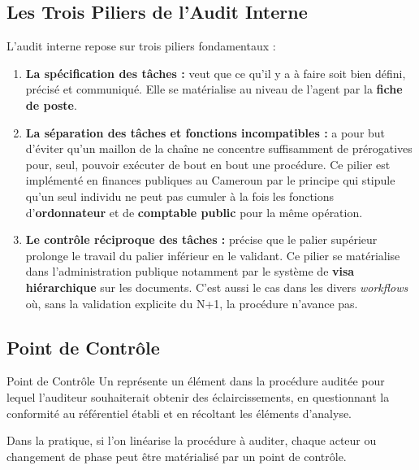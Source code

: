 \subsection{Les Trois Piliers de l'Audit Interne}

L'audit interne repose sur trois piliers fondamentaux :

\begin{enumerate}
  \item \textbf{La spécification des tâches :} veut que ce qu'il y a à faire soit
    bien défini, précisé et communiqué. Elle se matérialise au niveau de l'agent par
    la \textbf{fiche de poste}.

  \item \textbf{La séparation des tâches et fonctions incompatibles :} a pour but
    d'éviter qu'un maillon de la chaîne ne concentre suffisamment de prérogatives
    pour, seul, pouvoir exécuter de bout en bout une procédure. Ce pilier est
    implémenté en finances publiques au Cameroun par le principe qui stipule qu'un
    seul individu ne peut pas cumuler à la fois les fonctions d'\textbf{ordonnateur}
    et de \textbf{comptable public} pour la même opération.

  \item \textbf{Le contrôle réciproque des tâches :} précise que le palier supérieur
    prolonge le travail du palier inférieur en le validant. Ce pilier se matérialise
    dans l'administration publique notamment par le système de \textbf{visa
    hiérarchique} sur les documents. C'est aussi le cas dans les divers \textit{workflows}
    où, sans la validation explicite du N+1, la procédure n'avance pas.
\end{enumerate}

\subsection{Point de Contrôle}

\begin{boxdef}{Point de Contrôle}
Un  représente un élément dans la procédure auditée pour
lequel l'auditeur souhaiterait obtenir des éclaircissements, en questionnant la
conformité au référentiel établi et en récoltant les éléments d'analyse.

Dans la pratique, si l'on linéarise la procédure à auditer, chaque acteur ou changement
de phase peut être matérialisé par un point de contrôle.
\end{boxdef}

